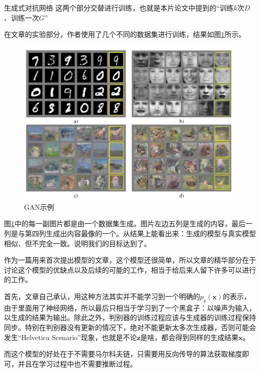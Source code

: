 \documentclass{ctexart}
\begin{document}
\begin{section}{生成式对抗网络}
		这两个部分交替进行训练，也就是本片论文中提到的“训练$k$次$D$、训练一次$G$”
		
		在文章的实验部分，作者使用了几个不同的数据集进行训练，结果如图\ref{fig:gan-example}所示。
		
		\begin{figure}
			\centering
			\includegraphics[width=30em]{figures/GAN-experiment-demo-pic.PNG}
			\caption{GAN示例}
			\label{fig:gan-example}
		\end{figure}
	
		图\ref{fig:gan-example}中的每一副图片都是由一个数据集生成。图片左边五列是生成的内容，最后一列是与第四列生成出内容最像的一个。从结果上能看出来：生成的模型与真实模型相似、但不完全一致。说明我们的目标达到了。
		
		作为一篇用来首次提出模型的文章，这个模型还很简单，所以文章的精华部分在于讨论这个模型的优缺点以及后续的可能的工作，相当于给后来人留下许多可以进行的工作。
		
		首先，文章自己承认，用这种方法其实并不能学习到一个明确的$p_g(\boldsymbol{x})$的表示，由于里面用了神经网络，所以最后只相当于学习到了一个黑盒子：以噪声为输入，以生成的结果为输出。除此之外，判别器的训练过程应该与生成器的训练过程保持同步。特别在判别器没有更新的情况下，绝对不能更新太多次生成器，否则可能会发生“Helvetica Scenario”现象，也就是不论$\boldsymbol{z}$是啥，都会得到同样的生成结果$\boldsymbol{x}$。
		
		而这个模型的好处在于不需要马尔科夫链，只需要用反向传导的算法获取梯度即可，并且在学习过程中也不需要推断过程。
		

\end{section}
\end{document}
